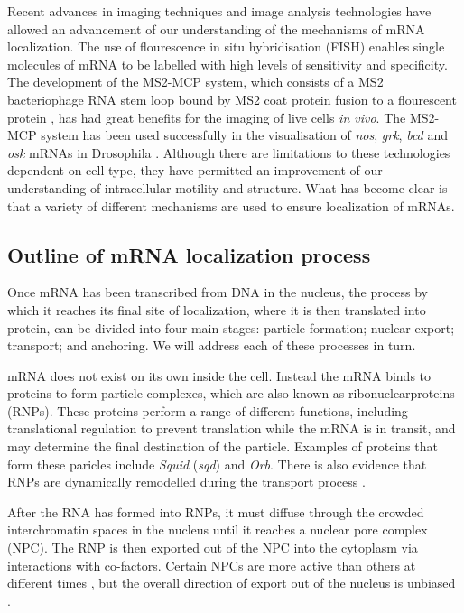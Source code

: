 \documentclass[twocolumn]{biophys}
\begin{document}
Recent advances in imaging techniques and image analysis technologies \citep{jeffery1983localization, bertrand1998localization, hamilton2010particlestats} have allowed an advancement of our understanding of the mechanisms of mRNA localization. 
The use of flourescence in situ hybridisation (FISH) enables single molecules of mRNA to be labelled with high levels of sensitivity and specificity. 
The development of the MS2-MCP system, which consists of a MS2 bacteriophage RNA stem loop bound by MS2 coat protein fusion to a flourescent protein \citep{parton2014subcellular}, has had great benefits for the imaging of live cells \textit{in vivo}.
The MS2-MCP system has been used successfully in the visualisation of \textit{nos}, \textit{grk}, \textit{bcd} and \textit{osk} mRNAs in Drosophila \citep{forrest2003live, jaramillo2008dynamics, weil2006localization, zimyanin2008vivo}.
Although there are limitations to these technologies dependent on cell type, they have permitted an improvement of our understanding of intracellular motility and structure.
What has become clear is that a variety of different mechanisms are used to ensure localization of mRNAs.

\subsection{Outline of mRNA localization process}

Once mRNA has been transcribed from DNA in the nucleus, the process by which it reaches its final site of localization, where it is then translated into protein, can be divided into four main stages: particle formation; nuclear export; transport; and anchoring.
We will address each of these processes in turn.

mRNA does not exist on its own inside the cell.
Instead the mRNA binds to proteins to form particle complexes, which are also known as ribonuclearproteins (RNPs). 
These proteins perform a range of different functions, including translational regulation to prevent translation while the mRNA is in transit, and may determine the final destination of the particle. Examples of proteins that form these paricles include \textit{Squid} (\textit{sqd}) and \textit{Orb}.
There is also evidence that RNPs are dynamically remodelled during the transport process \citep{weil2012drosophila}.

After the RNA has formed into RNPs, it must diffuse through the crowded interchromatin spaces in the nucleus until it reaches a nuclear pore complex (NPC).
The RNP is then exported out of the NPC into the cytoplasm via interactions with co-factors.
Certain NPCs are more active than others at different times \citep{weil2012drosophila}, but the overall direction of export out of the nucleus is unbiased \citep{wilkie2001drosophila}. 
\end{document}
